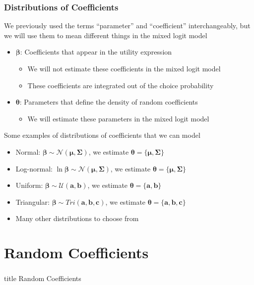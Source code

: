 \documentclass{beamer}\usepackage[]{graphicx}\usepackage[]{color}
\begin{document}
\begin{frame}\frametitle{Distributions of Coefficients}
    We previously used the terms ``parameter'' and ``coefficient'' interchangeably, but we will use them to mean different things in the mixed logit model
    \begin{itemize}
        \item $\bm{\beta}$: Coefficients that appear in the utility expression
        \begin{itemize}
            \item We will not estimate these coefficients in the mixed logit model
            \item These coefficients are integrated out of the choice probability
        \end{itemize}
        \item $\bm{\theta}$: Parameters that define the density of random coefficients
        \begin{itemize}
            \item We will estimate these parameters in the mixed logit model
        \end{itemize}
    \end{itemize}
    \vspace{2ex}
    Some examples of distributions of coefficients that we can model
    \begin{itemize}
        \item Normal: $\bm{\beta} \sim \mathcal{N}(\bm{\mu}, \bm{\Sigma})$, we estimate $\bm{\theta} = \{\bm{\mu}, \bm{\Sigma}\}$
        \item Log-normal: $\ln \bm{\beta} \sim \mathcal{N}(\bm{\mu}, \bm{\Sigma})$, we estimate $\bm{\theta} = \{\bm{\mu}, \bm{\Sigma}\}$
        \item Uniform: $\bm{\beta} \sim \mathcal{U}(\bm{a}, \bm{b})$, we estimate $\bm{\theta} = \{\bm{a}, \bm{b}\}$
        \item Triangular: $\bm{\beta} \sim Tri(\bm{a}, \bm{b}, \bm{c})$, we estimate $\bm{\theta} = \{\bm{a}, \bm{b}, \bm{c}\}$
        \item Many other distributions to choose from
    \end{itemize}
\end{frame}

\section{Random Coefficients}
\label{random}
\begin{frame}\frametitle{}
    \vfill
    \centering
    \begin{beamercolorbox}[center]{title}
        \Large Random Coefficients
    \end{beamercolorbox}
    \vfill
\end{frame}
\end{document}
